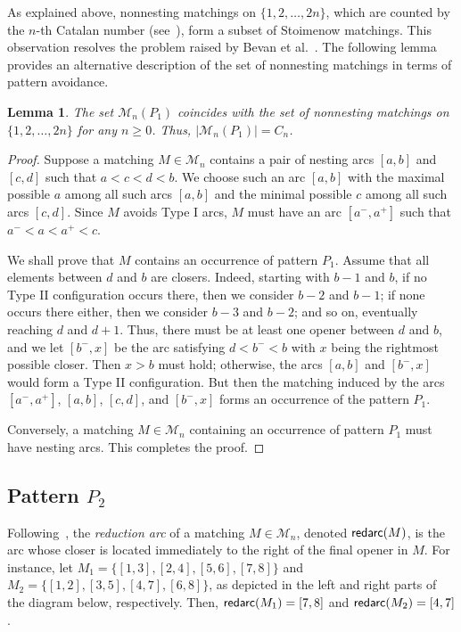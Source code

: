 \documentclass[11pt]{article}
\newtheorem{lem}[thm]{Lemma}
\newcommand{\M}{\mathcal{M}}
\newcommand{\red}{\mbox{\sf{redarc}}}
\begin{document}
	As explained above, nonnesting matchings on $\{1, 2, \ldots, 2n\}$, which are counted by the $n$-th Catalan number (see~\cite[Exercise~6.19]{Stanley}), form a subset of Stoimenow matchings. This observation resolves the problem raised by Bevan et al.~\cite{Bevan-Cheon-Kitaev}. The following lemma provides an alternative description of the set of nonnesting matchings in terms of pattern avoidance.
	
	\begin{lem}\label{lem-Nonnesting}
		The set $\M_n(P_1)$ coincides with the set of nonnesting matchings on $\{1, 2, \ldots, 2n\}$ for any $n \geq 0$.
		Thus, $|\mathcal{M}_n(P_1)| = C_n$. 
	\end{lem}
	\begin{proof}
		Suppose a matching $M \in \mathcal{M}_n$ contains a pair of nesting arcs $[a,b]$ and $[c,d]$ such that $a < c < d < b$. 
		We choose such an arc $[a,b]$ with the maximal possible $a$ among all such arcs $[a,b]$ and  the minimal possible $c$ among all such arcs $[c,d]$. 
		Since $M$ avoids Type I arcs, $M$ must have an arc $[a^-,a^+]$ such that $a^-<a<a^+<c$. 
		
		We shall prove that $M$ contains an occurrence of  pattern $P_1$. 
		Assume that all elements between $d$ and $b$ are closers.
		Indeed, starting with $b-1$ and $b$, if no Type II configuration occurs there, then we consider $b-2$ and $b-1$; if none occurs there either, then we consider $b-3$ and $b-2$; and so on, eventually reaching $d$ and $d+1$.
		Thus, there must be at least one opener between $d$ and $b$, and we let $[b^-, x]$ be the arc satisfying $d < b^- < b$ with $x$ being the rightmost possible closer. Then $x > b$ must hold; otherwise, the arcs $[a,b]$ and $[b^-,x]$ would form a Type II configuration. 
		But then the matching induced by the arcs $[a^-,a^+]$, $[a,b]$, $[c,d]$, and $[b^-,x]$ forms an occurrence of the pattern $P_1$.
		
		Conversely, a matching $M \in \M_n$ containing an occurrence of pattern $P_1$ must have nesting arcs. This completes the proof.\end{proof}
	
	\subsection{Pattern $P_2$}\label{P2-sec}
	Following~\cite{Claesson-Dukes-Kitaev}, the \textit{reduction arc} of a matching $M \in \mathcal{M}_n$, denoted $\red(M)$, is the arc whose closer is located immediately to the right of the final opener in $M$. For instance, let $M_1 = \{[1,3], [2,4], [5,6], [7,8]\}$ and $M_2 = \{[1,2], [3,5], [4,7], [6,8]\}$, as depicted in the left and right parts of the diagram below, respectively. Then, $\red(M_1) = [7,8]$ and $\red(M_2) = [4,7]$.\\[-0.7cm]
	
\end{document}
